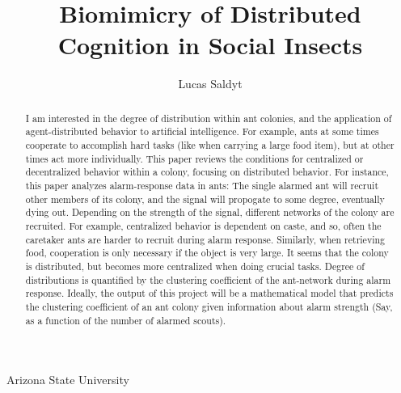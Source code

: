 \documentclass{nature}
\title{Biomimicry of Distributed Cognition in Social Insects}
\author{Lucas Saldyt}
\begin{document}
\maketitle

\begin{affiliations}
 \item Arizona State University
\end{affiliations}

\begin{abstract}
    I am interested in the degree of distribution within ant colonies, and the application of agent-distributed behavior to artificial intelligence.
    For example, ants at some times cooperate to accomplish hard tasks (like when carrying a large food item), but at other times act more individually.
    This paper reviews the conditions for centralized or decentralized behavior within a colony, focusing on distributed behavior.
    For instance, this paper analyzes alarm-response data in ants: The single alarmed ant will recruit other members of its colony, and the signal will propogate to some degree, eventually dying out.
    Depending on the strength of the signal, different networks of the colony are recruited.
    For example, centralized behavior is dependent on caste, and so, often the caretaker ants are harder to recruit during alarm response.
    Similarly, when retrieving food, cooperation is only necessary if the object is very large.
    It seems that the colony is distributed, but becomes more centralized when doing crucial tasks. 
    Degree of distributions is quantified by the clustering coefficient of the ant-network during alarm response.
    Ideally, the output of this project will be a mathematical model that predicts the clustering coefficient of an ant colony given information about alarm strength (Say, as a function of the number of alarmed scouts).


\end{abstract}
\end{document}

